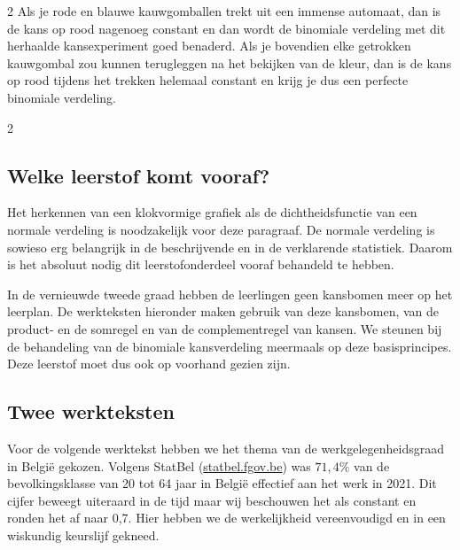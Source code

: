 \begin{multicols}{2}
    Als je rode en blauwe kauwgomballen trekt uit een immense automaat, dan is de kans op rood nagenoeg constant en dan wordt de binomiale verdeling met dit herhaalde kansexperiment goed benaderd. Als je bovendien elke getrokken kauwgombal zou kunnen terugleggen na het bekijken van de kleur, dan is de kans op rood tijdens het trekken helemaal constant en krijg je dus een perfecte binomiale verdeling.

    \end{multicols}


    \begin{multicols}{2}

    \subsection*{Welke leerstof komt vooraf?}
    
    Het herkennen van een klokvormige grafiek als de dichtheidsfunctie van een normale verdeling is noodzakelijk voor deze paragraaf. De normale verdeling is sowieso erg belangrijk in de beschrijvende en in de verklarende statistiek. Daarom is het absoluut nodig dit leerstofonderdeel vooraf behandeld te hebben.

    In de vernieuwde tweede graad hebben de leerlingen geen kansbomen meer op het leerplan. De werkteksten hieronder maken gebruik van deze kansbomen, van de product- en de somregel en van de complementregel van kansen. We steunen bij de behandeling van de binomiale kansverdeling meermaals op deze basisprincipes. Deze leerstof moet dus ook op voorhand gezien zijn.

    
 \subsection*{Twee werkteksten}
 
    Voor de volgende werktekst hebben we het thema van de werkgelegenheidsgraad in België gekozen. Volgens StatBel (\url{statbel.fgov.be}) was $71,4\%$ van de bevolkingsklasse van 20 tot 64 jaar in België effectief aan het werk in 2021. Dit cijfer beweegt uiteraard in de tijd maar wij beschouwen het als constant en ronden het af naar 0,7. Hier hebben we de werkelijkheid vereenvoudigd en in een wiskundig keurslijf gekneed. 
	
\end{multicols}

